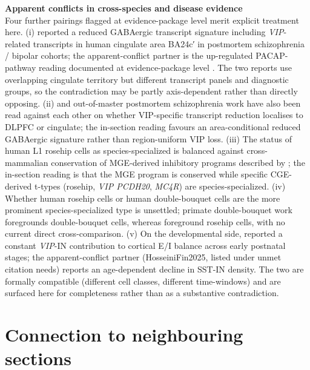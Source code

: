\documentclass[11pt]{article}
\begin{document}
\begin{framed}
\textbf{Apparent conflicts in cross-species and disease evidence}\\
Four further pairings flagged at evidence-package level merit explicit
treatment here. (i) \citet{Krolewski2025} reported a reduced
GABAergic transcript signature including \textit{VIP}-related transcripts in
human cingulate area BA24c′ in postmortem schizophrenia / bipolar
cohorts; the apparent-conflict partner is the up-regulated
PACAP-pathway reading documented at evidence-package level
\citep{Slabe2023}. The two reports use
overlapping cingulate territory but different transcript panels and
diagnostic groups, so the contradiction may be partly axis-dependent
rather than directly opposing. (ii) \citet{Krolewski2025} and
out-of-master postmortem schizophrenia work have also been read against
each other on whether VIP-specific transcript reduction localises to
DLPFC or cingulate; the in-section reading favours an
area-conditional reduced GABAergic signature rather than
region-uniform VIP loss. (iii) The status of human L1 rosehip cells as
species-specialized \citep{Boldog2018} is balanced against
cross-mammalian conservation of MGE-derived inhibitory programs
described by \citep{Keefe2023}; the in-section reading is that the
MGE program is conserved while specific CGE-derived t-types
(rosehip, \textit{VIP PCDH20}, \textit{MC4R}) are species-specialized. (iv) Whether
human rosehip cells or human double-bouquet cells are the more
prominent species-specialized type is unsettled; primate double-bouquet
work foregrounds double-bouquet cells, whereas
\citep{Boldog2018} foreground rosehip cells, with no current
direct cross-comparison. (v) On the developmental side,
reported a constant \textit{VIP}-IN contribution to
cortical E/I balance across early postnatal stages; the
apparent-conflict partner (HosseiniFin2025, listed under unmet
citation needs) reports an age-dependent decline in
SST-IN density. The two are formally compatible (different cell
classes, different time-windows) and are surfaced here for
completeness rather than as a substantive contradiction.
\end{framed}

\section{Connection to neighbouring sections}
\end{document}
